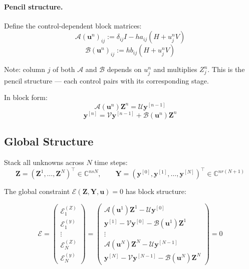 \documentclass[11pt]{article}
\newcommand{\CC}{\mathbb{C}}
\newcommand{\tp}{^\top}
\newcommand{\Zv}{\mathbf{Z}}
\newcommand{\yv}{\mathbf{y}}
\newcommand{\uv}{\mathbf{u}}
\newcommand{\Av}{\mathcal{A}}
\newcommand{\Bv}{\mathcal{B}}
\newcommand{\Uv}{\mathcal{U}}
\newcommand{\Vv}{\mathcal{V}}
\begin{document}
\paragraph{Pencil structure.} Define the control-dependent block matrices:
\begin{equation}
\Av(\uv^n)_{ij} := \delta_{ij} I - h a_{ij}(H + u_j^n V)
\end{equation}
\begin{equation}
\Bv(\uv^n)_{ij} := h b_{ij}(H + u_j^n V)
\end{equation}

Note: column $j$ of both $\Av$ and $\Bv$ depends on $u_j^n$ and multiplies $Z_j^n$. This is the pencil structure — each control pairs with its corresponding stage.

In block form:
\begin{equation}
\label{eqn:glm_block_stage}
\boxed{\Av(\uv^n) \Zv^n = \Uv \yv^{[n-1]}}
\end{equation}
\begin{equation}
\label{eqn:glm_block_prop}
\boxed{\yv^{[n]} = \Vv \yv^{[n-1]} + \Bv(\uv^n) \Zv^n}
\end{equation}

\subsection{Global Structure}

Stack all unknowns across $N$ time steps:
\begin{equation}
\mathbf{Z} = (\Zv^1, \ldots, \Zv^N)\tp \in \CC^{nsN}, \qquad
\mathbf{Y} = (\yv^{[0]}, \yv^{[1]}, \ldots, \yv^{[N]})\tp \in \CC^{nr(N+1)}
\end{equation}

The global constraint $\mathcal{E}(\mathbf{Z}, \mathbf{Y}, \mathbf{u}) = 0$ has block structure:

\begin{equation}
\mathcal{E} = \begin{pmatrix}
\mathcal{E}^{(Z)}_1 \\
\mathcal{E}^{(y)}_1 \\
\vdots \\
\mathcal{E}^{(Z)}_N \\
\mathcal{E}^{(y)}_N
\end{pmatrix}
= \begin{pmatrix}
\Av(\uv^1) \Zv^1 - \Uv \yv^{[0]} \\
\yv^{[1]} - \Vv \yv^{[0]} - \Bv(\uv^1) \Zv^1 \\
\vdots \\
\Av(\uv^N) \Zv^N - \Uv \yv^{[N-1]} \\
\yv^{[N]} - \Vv \yv^{[N-1]} - \Bv(\uv^N) \Zv^N
\end{pmatrix} = 0
\end{equation}
\end{document}
